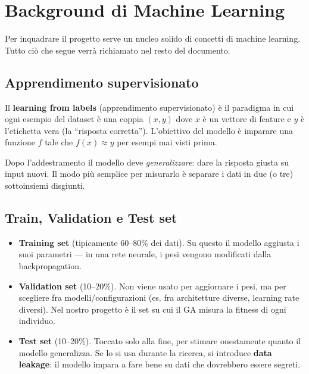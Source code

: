 \documentclass[11pt,a4paper]{article}
\begin{document}
\section{Background di Machine Learning}

Per inquadrare il progetto serve un nucleo solido di concetti di machine
learning. Tutto ciò che segue verrà richiamato nel resto del documento.

\subsection{Apprendimento supervisionato}

Il \textbf{learning from labels} (apprendimento supervisionato) è il
paradigma in cui ogni esempio del dataset è una coppia $(x, y)$ dove $x$ è
un vettore di feature e $y$ è l'etichetta vera (la ``risposta corretta'').
L'obiettivo del modello è imparare una funzione $f$ tale che $f(x) \approx y$
per esempi mai visti prima.

Dopo l'addestramento il modello deve \emph{generalizzare}: dare la risposta
giusta su input nuovi. Il modo più semplice per misurarlo è separare i
dati in due (o tre) sottoinsiemi disgiunti.

\subsection{Train, Validation e Test set}

\begin{itemize}
    \item \textbf{Training set} (tipicamente 60--80\% dei dati). Su questo
          il modello aggiusta i suoi parametri --- in una rete neurale, i
          pesi vengono modificati dalla backpropagation.
    \item \textbf{Validation set} (10--20\%). Non viene usato per
          aggiornare i pesi, ma per scegliere fra modelli/configurazioni
          (es. fra architetture diverse, learning rate diversi). Nel nostro
          progetto è il set su cui il GA misura la fitness di ogni
          individuo.
    \item \textbf{Test set} (10--20\%). Toccato solo alla fine, per
          stimare onestamente quanto il modello generalizza. Se lo si usa
          durante la ricerca, si introduce \textbf{data leakage}: il
          modello impara a fare bene su dati che dovrebbero essere segreti.
\end{itemize}
\end{document}
